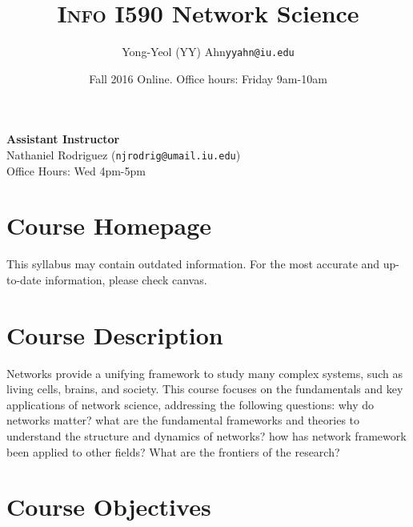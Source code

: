 \documentclass[11pt,article,oneside]{memoir}
\makeatletter
\def\myauthor{Author}
\def\mytitle{Title}
\def\myemail{yyahn@iu.edu}
\def\myauthor{Yong-Yeol (YY) Ahn}
\def\mytitle{{\normalsize \textsc{Info} I590 \newline} \HUGE Network Science}
\makeatother
\begin{document}

\def\ind{\hangindent=1 true cm\hangafter=1 \noindent}
\def\labelitemi{$\cdot$}


\title{\LARGE \mytitle}     
\author{\Large\myauthor \newline \footnotesize\texttt{\noindent\myemail}}
\date{Fall 2016 Online. %
\newline Office hours: Friday 9am-10am}

\maketitle

\vspace{-20pt}
{\bfseries Assistant Instructor} \\ Nathaniel Rodriguez (\texttt{njrodrig@umail.iu.edu}) \\ Office Hours: Wed 4pm-5pm 

\section{Course Homepage}

This syllabus may contain outdated information. For the most accurate and up-to-date information, 
please check canvas. %

\section{Course Description}

Networks provide a unifying framework to study many complex systems, such as
living cells, brains, and society. This course focuses on the fundamentals and
key applications of network science, addressing the following questions: why do
networks matter? what are the fundamental frameworks and theories to understand
the structure and dynamics of networks? how has network framework been applied
to other fields? What are the frontiers of the research?

\section{Course Objectives}
\end{document}
